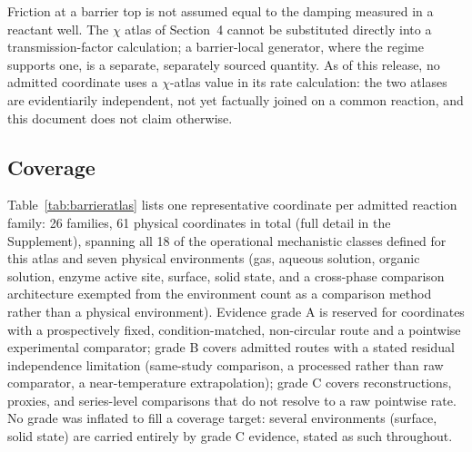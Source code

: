 Friction at a barrier top is not assumed equal to the damping measured in a
reactant well. The \(\chi\) atlas of Section~4 cannot be substituted directly
into a transmission-factor calculation; a barrier-local generator, where the
regime supports one, is a separate, separately sourced quantity. As of this
release, no admitted coordinate uses a \(\chi\)-atlas value in its rate
calculation: the two atlases are evidentiarily independent, not yet
factually joined on a common reaction, and this document does not claim
otherwise.

\subsection{Coverage}

Table~\ref{tab:barrieratlas} lists one representative coordinate per
admitted reaction family: 26 families, 61 physical coordinates in total
(full detail in the Supplement), spanning all 18 of the operational
mechanistic classes defined for this atlas and seven physical environments
(gas, aqueous solution, organic solution, enzyme active site, surface, solid
state, and a cross-phase comparison architecture exempted from the
environment count as a comparison method rather than a physical
environment). Evidence grade A is reserved for coordinates with a
prospectively fixed, condition-matched, non-circular route and a pointwise
experimental comparator; grade B covers admitted routes with a stated
residual independence limitation (same-study comparison, a processed rather
than raw comparator, a near-temperature extrapolation); grade C covers
reconstructions, proxies, and series-level comparisons that do not resolve
to a raw pointwise rate. No grade was inflated to fill a coverage target:
several environments (surface, solid state) are carried entirely by grade C
evidence, stated as such throughout.

